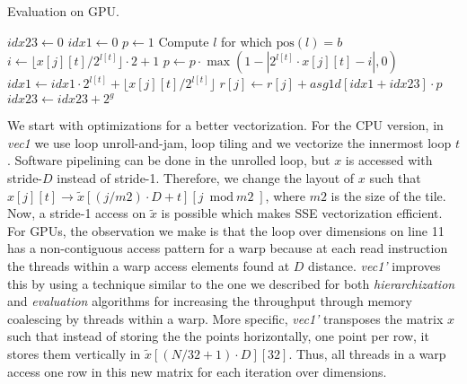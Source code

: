 \begin{algorithm}[h]
\small{
	\caption{Evaluation on GPU.}
	\label{alg:evaluation}
	\begin{algorithmic}[1]
    		\State $\textit{idx23} \leftarrow 0$
						\State $\textit{idx1} \leftarrow 0$
						\State $\textit{p} \leftarrow 1$
							\State Compute $l$ for which $\text{pos}(l) = b$
						\EndIf
							\State $i \leftarrow \lfloor x[j][t] / 2^{l[t]} \rfloor \cdot 2 + 1$
							\State $p \leftarrow p \cdot \max(1 - |2^{l[t]} \cdot x[j][t] - i|, 0)$
							\State $\textit{idx1} \leftarrow \textit{idx1} \cdot 2^{l[t]} + \lfloor	x[j][t] / 2^{l[t]} \rfloor$
						\EndFor
						\State $r[j] \leftarrow r[j] + \textit{asg1d}[\textit{idx1}	+\textit{idx23}] \cdot p$ 
						\State $\textit{idx23} \leftarrow \textit{idx23} + 2^g$
					\EndFor
				\EndFor
    		\EndFor
    	\EndProcedure
 	\end{algorithmic}
}
\end{algorithm}

We start with optimizations for a better vectorization. For the CPU version,
in \textit{vec1} we use loop unroll-and-jam, loop tiling and we vectorize the
innermost loop $t$. Software pipelining can be done in the unrolled loop, but
$x$ is accessed with stride-$D$ instead of stride-1. Therefore, we change the
layout of $x$ such that $x[j][t] \rightarrow \tilde{x}[(j/\textit{m2}) \cdot D +
t][j \bmod \textit{m2}]$, where $\textit{m2}$ is the size of the tile. Now, a
stride-1 access on $\tilde{x}$ is possible which makes SSE vectorization
efficient. For GPUs, the observation we make is that the loop over dimensions on
line 11 has a non-contiguous access pattern for a warp because at each read
instruction the threads within a warp access elements found at $D$ distance.
\textit{vec1'} improves this by using a technique similar to the one we
described for both \textit{hierarchization} and \textit{evaluation} algorithms
for increasing the throughput through memory coalescing by threads within a
warp. More specific, \textit{vec1'} transposes the matrix $x$ such that instead
of storing the the points horizontally, one point per row, it stores them
vertically in $\tilde{x}[(N/32+1) \cdot D][32]$. Thus, all threads in a warp
access one row in this new matrix for each iteration over dimensions.


